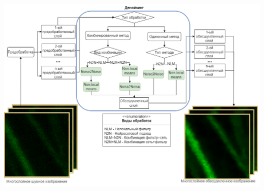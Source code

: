 \begin{minipage}{\textwidth}
	\centering
	\vspace{\mfloatsep} %
	\includegraphics[keepaspectratio=true,scale=0.37] {my_folder/images/denoising/schema_denoising.png}
	\label{fig:3d-denoise-schema}  
	\vspace{\mfloatsep} %
\end{minipage}

